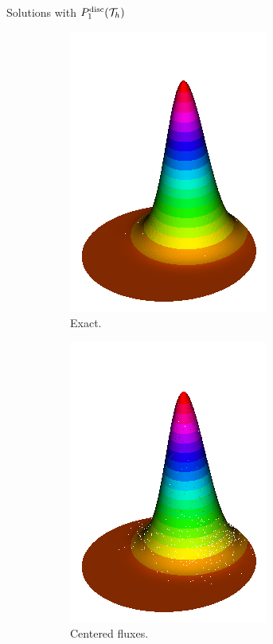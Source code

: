 \begin{frame}{Solutions with $\relax{P}^{\text{disc}}_1(\mathcal{T}_h)$}
\begin{figure}[h!]
\begin{subfigure}[b]{0.27\textwidth}
				\includegraphics[scale=0.18]{img/Conveccion_Reaccion/Recortes/steady_convect_react_exact_n_256.png}
				\caption{Exact.}
			\end{subfigure}
			\begin{subfigure}[b]{0.27\textwidth}
				\centering
				\includegraphics[scale=0.18]{img/Conveccion_Reaccion/Recortes/steady_convect_react_approx_CF_n_256.png}
				\caption{Centered fluxes.}
			\end{subfigure}
			\begin{subfigure}[b]{0.27\textwidth}
				\centering

\end{subfigure}
\end{figure}
\end{frame}

